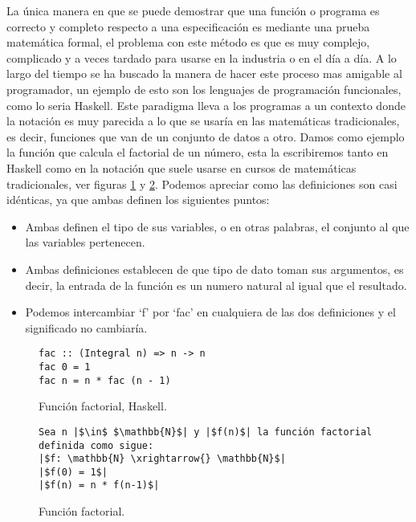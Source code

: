 La única manera en que se puede demostrar que una función o programa 
es correcto y completo respecto a una especificación es mediante una prueba 
matemática formal, el problema con este método es que es muy complejo, 
complicado y a veces tardado para usarse en la industria o en el día a día. A lo largo del tiempo se ha buscado la manera de hacer este proceso mas amigable al
programador, un ejemplo de esto son los lenguajes de programación funcionales, como lo seria Haskell. Este paradigma lleva
a los programas a un contexto donde la notaci\'on es muy parecida a lo que se usar\'ia en las
matemáticas tradicionales, es decir, funciones que van de un conjunto de datos a otro. Damos como ejemplo la funci\'on que calcula el factorial de un n\'umero, esta la escribiremos tanto en Haskell como en la notaci\'on que suele usarse en cursos de matemáticas tradicionales, ver figuras \ref{func_fact_hask} y \ref{func_fact_math}. 
Podemos apreciar como las definiciones son casi idénticas, ya que ambas definen los siguientes puntos:
\begin{itemize}
    \item Ambas definen el tipo de sus variables, o en otras palabras, el conjunto al que las variables pertenecen.
    \item Ambas definiciones establecen de que tipo de dato toman sus argumentos, es decir, la entrada de la funci\'on es un numero natural al igual que el resultado.
    \item Podemos intercambiar `f' por `fac' en cualquiera de las dos definiciones y el significado no cambiaría.
\end{itemize}
\begin{figure}[!ht]
\centering
\captionsetup{justification=centering}
\begin{verbatim}
fac :: (Integral n) => n -> n
fac 0 = 1
fac n = n * fac (n - 1)
\end{verbatim}
\caption{Funci\'on factorial, Haskell.}
\label{func_fact_hask}
\end{figure}

\begin{figure}[!ht]
\centering
\captionsetup{justification=centering}
\begin{verbatim}
Sea n |$\in$ $\mathbb{N}$| y |$f(n)$| la función factorial definida como sigue:
|$f: \mathbb{N} \xrightarrow{} \mathbb{N}$|
|$f(0) = 1$|
|$f(n) = n * f(n-1)$|
\end{verbatim}
\caption{Funci\'on factorial.}
\label{func_fact_math}
\end{figure}

